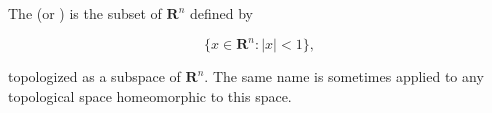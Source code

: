 The  (or ) is the subset of $\mathbf{R}^n$ defined by

$$\{x \in \mathbf{R}^n : |x| < 1\},$$

topologized as a subspace of $\mathbf{R}^n$. The same name is sometimes applied to any topological space homeomorphic to this space.
